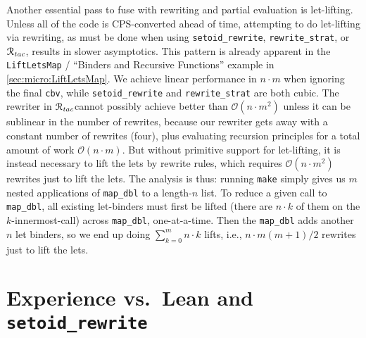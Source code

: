 \documentclass[a4paper,USenglish,cleveref,autoref,thm-restate]{lipics-v2021}
\newcommand{\Rtac}{\ensuremath{\mathcal{R}_\text{\emph{tac}}}}
\newcommand{\taccbv}{\texttt{cbv}}
\begin{document}
Another essential pass to fuse with rewriting and partial evaluation is let-lifting.
Unless all of the code is CPS-converted ahead of time, attempting to do let-lifting via rewriting, as must be done when using \texttt{setoid_rewrite}, \texttt{rewrite_strat}, or \Rtac, results in slower asymptotics.
This pattern is already apparent in the \texttt{LiftLetsMap} / ``Binders and Recursive Functions'' example in \autoref{sec:micro:LiftLetsMap}.
We achieve linear performance in $n\cdot m$ when ignoring the final \taccbv, while \texttt{setoid_rewrite} and \texttt{rewrite_strat} are both cubic.
The rewriter in \Rtac\space cannot possibly achieve better than $\mathcal{O}\left(n\cdot m^2\right)$ unless it can be sublinear in the number of rewrites, because our rewriter gets away with a constant number of rewrites (four), plus evaluating recursion principles for a total amount of work $\mathcal{O}(n\cdot m)$.
But without primitive support for let-lifting, it is instead necessary to lift the lets by rewrite rules, which requires
$\mathcal{O}\left(n\cdot m^2\right)$ rewrites just to lift the lets.
The analysis is thus: running \texttt{make} simply gives us $m$ nested applications of \texttt{map\_dbl} to a length-$n$ list.
To reduce a given call to \texttt{map\_dbl}, all existing let-binders must first be lifted (there are $n\cdot k$ of them on the $k$-innermost-call) across \texttt{map\_dbl}, one-at-a-time.
Then the \texttt{map\_dbl} adds another $n$ let binders, so we end up doing $\sum_{k=0}^{m} n\cdot k$ lifts, i.e., $n\cdot m(m+1)/2$ rewrites just to lift the lets.

\section{Experience vs.\ Lean and \texorpdfstring{\texttt{setoid\_rewrite}}{setoid\_rewrite}\label{sec:lean}}
\end{document}
